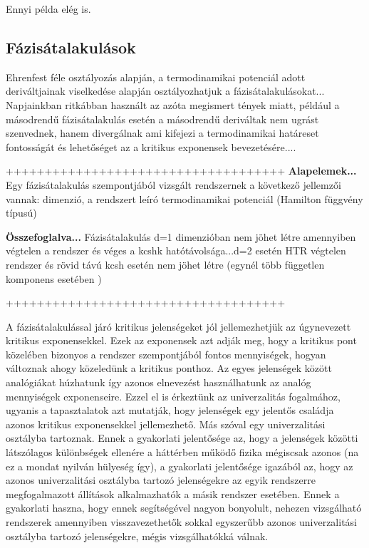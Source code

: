 Ennyi példa elég is.

\subsection*{Fázisátalakulások}

Ehrenfest féle osztályozás alapján, a termodinamikai potenciál adott deriváltjainak viselkedése alapján osztályozhatjuk a fázisátalakulásokat...
Napjainkban ritkábban használt az azóta megismert tények miatt, például a másodrendű fázisátalakulás esetén a másodrendű deriváltak nem ugrást szenvednek, hanem divergálnak ami kifejezi a termodinamikai határeset fontosságát és lehetőséget az a kritikus exponensek bevezetésére.... 

++++++++++++++++++++++++++++++++++++
{\bf Alapelemek...}
Egy fázisátalakulás szempontjából vizsgált rendszernek a következő jellemzői vannak:
dimenzió, a rendszert leíró termodinamikai potenciál (Hamilton függvény típusú)

{\bf Összefoglalva...}
Fázisátalakulás d=1 dimenzióban nem jöhet létre amennyiben végtelen a rendszer és véges a kcshk hatótávolsága...d=2 esetén HTR végtelen rendszer és rövid távú kcsh esetén nem jöhet létre (egynél több független komponens esetében )


++++++++++++++++++++++++++++++++++++


A fázisátalakulással járó kritikus jelenségeket jól jellemezhetjük az úgynevezett kritikus exponensekkel. Ezek az exponensek azt adják meg, hogy a kritikus pont közelében bizonyos a rendszer szempontjából fontos mennyiségek, hogyan változnak ahogy közeledünk a kritikus ponthoz. Az egyes jelenségek között analógiákat húzhatunk így azonos elnevezést használhatunk az analóg mennyiségek exponenseire. Ezzel el is érkeztünk az univerzalitás fogalmához, ugyanis a tapasztalatok azt mutatják, hogy jelenségek egy jelentős családja azonos kritikus exponensekkel jellemezhető. Más szóval egy univerzalitási osztályba tartoznak. Ennek a gyakorlati jelentősége az, hogy a jelenségek közötti látszólagos különbségek ellenére a háttérben működő fizika mégiscsak azonos (na ez a mondat nyilván hülyeség így), a gyakorlati jelentősége igazából az, hogy az azonos univerzalitási osztályba tartozó jelenségekre az egyik rendszerre megfogalmazott állítások alkalmazhatók a másik rendszer esetében. Ennek a gyakorlati haszna, hogy ennek segítségével nagyon bonyolult, nehezen vizsgálható rendszerek amennyiben visszavezethetők sokkal egyszerűbb azonos univerzalitási osztályba tartozó jelenségekre, mégis vizsgálhatókká válnak. 


